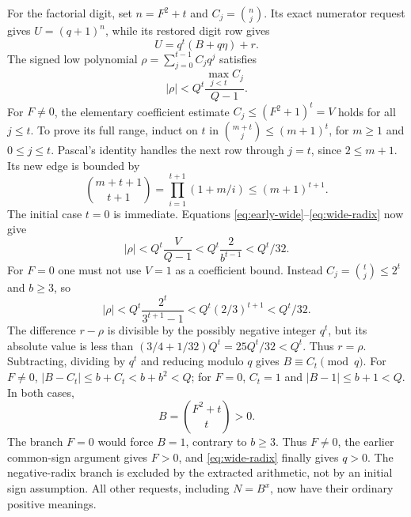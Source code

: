 For the factorial digit, set $n=F^2+t$ and
$C_j=\binom nj$. Its exact numerator request gives $U=(q+1)^n$,
while its restored digit row gives
\[
 U=q^t(B+q\eta)+r.
\]
The signed low polynomial
$\rho=\sum_{j=0}^{t-1}C_jq^j$ satisfies
\[
 |\rho|<Q^t\frac{\max_{j<t}C_j}{Q-1}.
\]
For $F\ne0$, the elementary coefficient estimate
$C_j\le(F^2+1)^t=V$ holds for all $j\le t$. To prove its full
range, induct on $t$ in
$\binom{m+t}{j}\le(m+1)^t$, for $m\ge1$ and $0\le j\le t$.
Pascal's identity handles the next row through $j=t$, since
$2\le m+1$. Its new edge is bounded by
\[
 \binom{m+t+1}{t+1}=\prod_{i=1}^{t+1}(1+m/i)\le(m+1)^{t+1}.
\]
The initial case $t=0$ is immediate. Equations
\eqref{eq:early-wide}--\eqref{eq:wide-radix} now give
\[
 |\rho|<Q^t\frac{V}{Q-1}
       <Q^t\frac{2}{b^{t-1}}<Q^t/32.
\]
For $F=0$ one must not use $V=1$ as a coefficient bound.
Instead $C_j=\binom tj\le2^t$ and $b\ge3$, so
\[
 |\rho|<Q^t\frac{2^t}{3^{t+1}-1}
       <Q^t(2/3)^{t+1}<Q^t/32.
\]
The difference $r-\rho$ is divisible by the possibly negative integer
$q^t$, but its absolute value is less than
$(3/4+1/32)Q^t=25Q^t/32<Q^t$. Thus $r=\rho$.
Subtracting, dividing by $q^t$ and reducing modulo $q$ gives
$B\equiv C_t\pmod q$. For $F\ne0$,
$|B-C_t|\le b+C_t<b+b^2<Q$; for $F=0$, $C_t=1$ and
$|B-1|\le b+1<Q$. In both cases,
\begin{equation}\label{eq:wide-binomial}
 B=\binom{F^2+t}{t}>0.
\end{equation}
The branch $F=0$ would force $B=1$, contrary to $b\ge3$.
Thus $F\ne0$, the earlier common-sign argument gives $F>0$, and
\eqref{eq:wide-radix} finally gives $q>0$.
The negative-radix branch is excluded by the extracted arithmetic,
not by an initial sign assumption. All other requests, including
$N=B^x$, now have their ordinary positive meanings.

